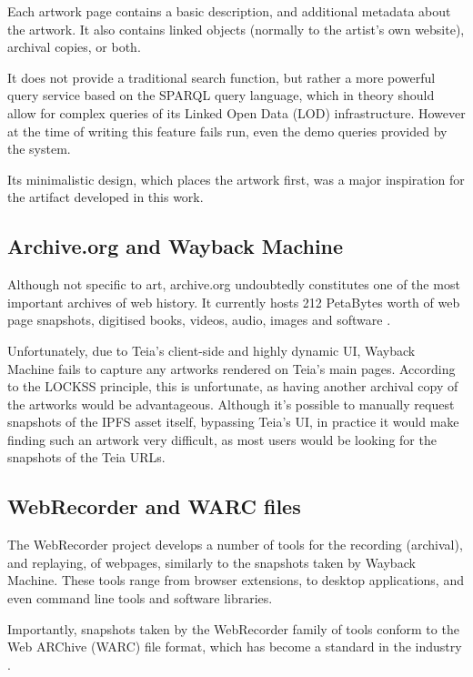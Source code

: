 Each artwork page contains a basic description, and additional metadata about the artwork. It also contains linked objects (normally to the artist's own website), archival copies, or both.

It does not provide a traditional search function, but rather a more powerful query service based on the SPARQL query language, which in theory should allow for complex queries of its Linked Open Data (LOD) infrastructure. However at the time of writing this feature fails run, even the demo queries provided by the system.

Its minimalistic design, which places the artwork first, was a major inspiration for the artifact developed in this work. 

\subsection{Archive.org and Wayback Machine}

Although not specific to art, archive.org undoubtedly constitutes one of the most important archives of web history. It currently hosts 212 PetaBytes worth of web page snapshots, digitised books, videos, audio, images and software \cite{InternetArchivePetabox}.

Unfortunately, due to Teia's client-side and highly dynamic UI, Wayback Machine fails to capture any artworks rendered on Teia's main pages. According to the LOCKSS principle, this is unfortunate, as having another archival copy of the artworks would be advantageous. Although it's possible to manually request snapshots of the IPFS asset itself, bypassing Teia's UI, in practice it would make finding such an artwork very difficult, as most users would be looking for the snapshots of the Teia URLs.

\subsection{WebRecorder and WARC files}

The WebRecorder project develops a number of tools for the recording (archival), and replaying, of webpages, similarly to the snapshots taken by Wayback Machine. These tools range from browser extensions, to desktop applications, and even command line tools and software libraries.

Importantly, snapshots taken by the WebRecorder family of tools conform to the Web ARChive (WARC) file format, which has become a standard in the industry \cite{WARCFileFormat2024}.


